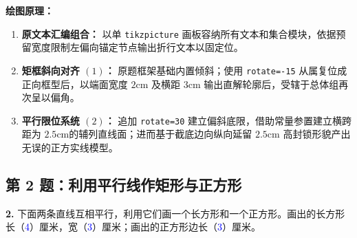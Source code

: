 \vspace{0.5cm}
\textbf{绘图原理：}
\begin{enumerate}
    \item \textbf{原文本汇编组合：} 以单 \texttt{tikzpicture} 画板容纳所有文本和集合模块，依据预留宽度限制左偏向锚定节点输出折行文本以固定位。
    \item \textbf{矩框斜向对齐 $(1)$：} 原题框架基础内置倾斜；使用 \texttt{rotate=-15} 从属复位成正向框型后，以端面宽度 $2\text{cm}$ 及横距 $3\text{cm}$ 输出直解轮廓后，受辖于总体组再次呈以偏角。
    \item \textbf{平行限位系统 $(2)$：} 追加 \texttt{rotate=30} 建立偏斜底限，借助常量参置建立横跨距为 $2.5\text{cm}$的辅列直线面；进而基于截底边向纵向延留 $2.5\text{cm}$ 高封锁形貌产出无误的正方实线模型。
\end{enumerate}

\vspace{1.5cm}

\newpage

\subsection{第 2 题：利用平行线作矩形与正方形}

\textbf{2.} 下面两条直线互相平行，利用它们画一个长方形和一个正方形。画出的长方形长（\;\textcolor{blue}{4}\;）厘米，宽（\;\textcolor{blue}{3}\;）厘米；画出的正方形边长（\;\textcolor{blue}{3}\;）厘米。

\vspace{0.5cm}
\begin{center}
\end{center}

